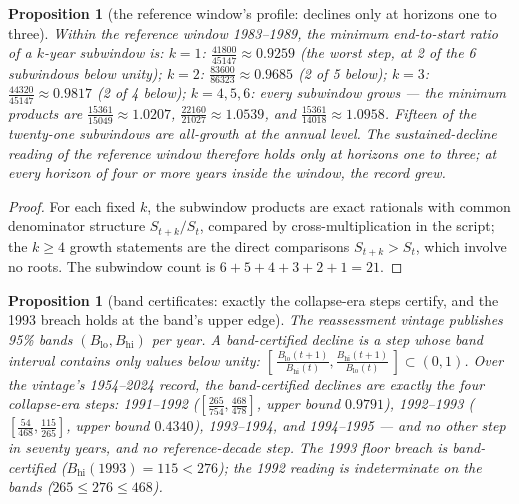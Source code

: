 \documentclass[10pt,twocolumn]{article}
\theoremstyle{plain}
\newtheorem{proposition}[theorem]{Proposition}
\theoremstyle{remark}
\begin{document}
\begin{proposition}[the reference window's profile: declines only at
horizons one to three]\label{prop:profile}
Within the reference window 1983--1989, the minimum end-to-start ratio
of a \(k\)-year subwindow is: \(k=1\):
\(\tfrac{41800}{45147} \approx 0.9259\) (the worst step, at 2 of the 6
subwindows below unity); \(k=2\): \(\tfrac{83600}{86323} \approx
0.9685\) (2 of 5 below); \(k=3\): \(\tfrac{44320}{45147} \approx
0.9817\) (2 of 4 below); \(k = 4, 5, 6\): every subwindow grows ---
the minimum products are \(\tfrac{15361}{15049} \approx 1.0207\),
\(\tfrac{22160}{21027} \approx 1.0539\), and
\(\tfrac{15361}{14018} \approx 1.0958\). Fifteen of the twenty-one
subwindows are all-growth at the annual level. The sustained-decline
reading of the reference window therefore holds only at horizons one
to three; at every horizon of four or more years inside the window,
the record grew.
\end{proposition}

\begin{proof}
For each fixed \(k\), the subwindow products are exact rationals with
common denominator structure \(S_{t+k}/S_t\), compared by
cross-multiplication in the script; the \(k \ge 4\) growth statements
are the direct comparisons \(S_{t+k} > S_t\), which involve no roots.
The subwindow count is \(6+5+4+3+2+1 = 21\).
\end{proof}

\begin{proposition}[band certificates: exactly the collapse-era steps
certify, and the 1993 breach holds at the band's upper edge]
\label{prop:bands}
The reassessment vintage publishes 95\% bands \((B_{\mathrm{lo}},
B_{\mathrm{hi}})\) per year. A band-certified decline is a step whose
band interval contains only values below unity:
\([\,\tfrac{B_{\mathrm{lo}}(t+1)}{B_{\mathrm{hi}}(t)},
\tfrac{B_{\mathrm{hi}}(t+1)}{B_{\mathrm{lo}}(t)}\,] \subset (0,1)\).
Over the vintage's 1954--2024 record, the band-certified declines are
exactly the four collapse-era steps: 1991--1992
(\([\tfrac{265}{754}, \tfrac{468}{478}]\), upper bound \(0.9791\)),
1992--1993 (\([\tfrac{54}{468}, \tfrac{115}{265}]\), upper bound
\(0.4340\)), 1993--1994, and 1994--1995 --- and no other step in
seventy years, and no reference-decade step. The 1993 floor breach is
band-certified (\(B_{\mathrm{hi}}(1993) = 115 < 276\)); the 1992
reading is indeterminate on the bands (\(265 \le 276 \le 468\)).
\end{proposition}
\end{document}
